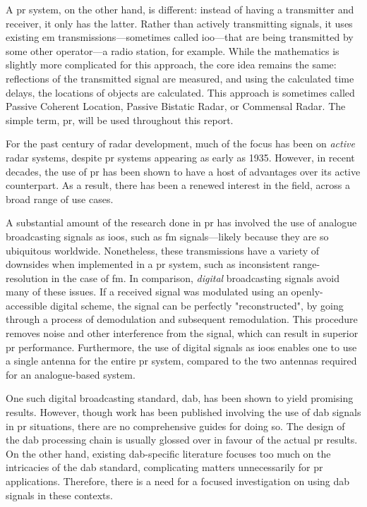 \documentclass[class=report,11pt,crop=false]{standalone}
\begin{document}
A \gls{pr} system, on the other hand, is different: instead of having a transmitter and receiver, it only has the latter. Rather than actively transmitting signals, it uses existing \gls{em} transmissions---sometimes called \gls{ioo}---that are being transmitted by some other operator---a radio station, for example. While the mathematics is slightly more complicated for this approach, the core idea remains the same: reflections of the transmitted signal are measured, and using the calculated time delays, the locations of objects are calculated. This approach is sometimes called Passive Coherent Location, Passive Bistatic Radar, or Commensal Radar. The simple term, \gls{pr}, will be used throughout this report.

For the past century of radar development, much of the focus has been on \emph{active} radar systems, despite \gls{pr} systems appearing as early as 1935. However, in recent decades, the use of \gls{pr} has been shown to have a host of advantages over its active counterpart. As a result, there has been a renewed interest in the field, across a broad range of use cases.

A substantial amount of the research done in \gls{pr} has involved the use of analogue broadcasting signals as \gls{ioo}s, such as \gls{fm} signals---likely because they are so ubiquitous worldwide. Nonetheless, these transmissions have a variety of downsides when implemented in a \gls{pr} system, such as inconsistent range-resolution in the case of \gls{fm}. In comparison, \emph{digital} broadcasting signals avoid many of these issues. If a received signal was modulated using an openly-accessible digital scheme, the signal can be perfectly "reconstructed", by going through a process of demodulation and subsequent remodulation. This procedure removes noise and other interference from the signal, which can result in superior \gls{pr} performance. Furthermore, the use of digital signals as \gls{ioo}s enables one to use a single antenna for the entire \gls{pr} system, compared to the two antennas required for an analogue-based system.

One such digital broadcasting standard, \gls{dab}, has been shown to yield promising results.  However, though work has been published involving the use of \gls{dab} signals in \gls{pr} situations, there are no comprehensive guides for doing so. The design of the \gls{dab} processing chain is usually glossed over in favour of the actual \gls{pr} results. On the other hand, existing \gls{dab}-specific literature focuses too much on the intricacies of the \gls{dab} standard, complicating matters unnecessarily for \gls{pr} applications. Therefore, there is a need for a focused investigation on using \gls{dab} signals in these contexts.
\end{document}
